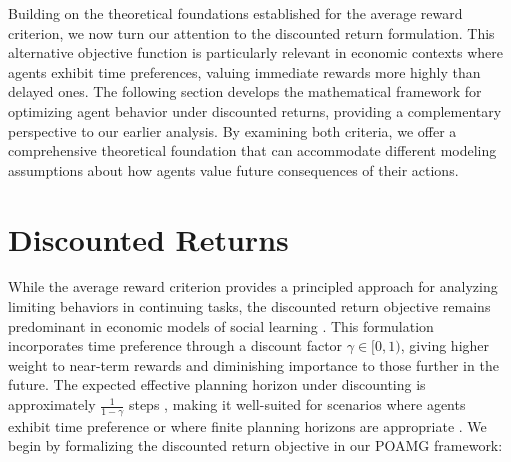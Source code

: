 Building on the theoretical foundations established for the average reward criterion, we now turn our attention to the discounted return formulation. This alternative objective function is particularly relevant in economic contexts where agents exhibit time preferences, valuing immediate rewards more highly than delayed ones. The following section develops the mathematical framework for optimizing agent behavior under discounted returns, providing a complementary perspective to our earlier analysis. By examining both criteria, we offer a comprehensive theoretical foundation that can accommodate different modeling assumptions about how agents value future consequences of their actions.

\section{Discounted Returns}

While the average reward criterion provides a principled approach for analyzing limiting behaviors in continuing tasks, the discounted return objective remains predominant in economic models of social learning \citep{keller2005strategic, bolton1999strategic, huang2024learning,brandl2024}. This formulation incorporates time preference through a discount factor $\gamma \in [0, 1)$, giving higher weight to near-term rewards and diminishing importance to those further in the future. The expected effective planning horizon under discounting is approximately $\frac{1}{1-\gamma}$ steps \citep{kearns2002near}, making it well-suited for scenarios where agents exhibit time preference or where finite planning horizons are appropriate \citep{frederick2002time, sutton2018reinforcement}. We begin by formalizing the discounted return objective in our POAMG framework:


